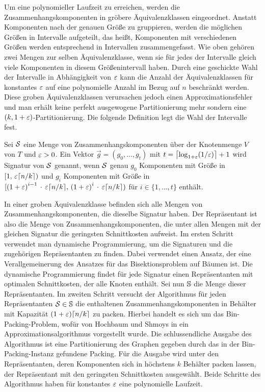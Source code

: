 Um eine polynomieller Laufzeit zu erreichen, werden die Zusammenhangskomponenten in gröbere Äquivalenzklassen eingeordnet.
Anstatt Komponenten nach der genauen Größe zu gruppieren, werden die möglichen Größen in Intervalle aufgeteilt, das heißt, Komponenten mit verschiedenen Größen werden entsprechend in Intervallen zusammengefasst. 
Wie oben gehören zwei Mengen zur selben Äquivalenzklasse, wenn sie für jedes der Intervalle gleich viele Komponenten in diesem Größenintervall haben.
Durch eine geschickte Wahl der Intervalle in Abhängigkeit von $\eps$ kann die Anzahl der Äquivalenzklassen für konstantes $\eps$ auf eine polynomielle Anzahl im Bezug auf $n$ beschränkt werden.
Diese groben Äquivalenzklassen verursachen jedoch einen Approximationsfehler und man erhält keine perfekt ausgewogene Partitionierung mehr sondern eine $(k, 1+\eps)$\hyp Partitionierung. Die folgende Definition legt die Wahl der Intervalle fest. \\

\begin{defn}[Signatur]\label{defn:signature}
    Sei $\calS$ eine Menge von Zusammenhangskomponenten über der Knotenmenge $V$ von $T$ und $\eps > 0$. Ein Vektor $\vec{g} = (g_0, \ldots, g_t)$ mit $t = \ceil*{\log_{1+\eps}(1/\eps)} + 1$ wird Signatur von $\calS$ genannt, wenn $\calS$ genau $g_0$ Komponenten mit Größe in $[1,\, \eps \ceil*{n/k})$ und $g_i$ Komponenten mit Größe in $[{(1+\eps)}^{i-1}\, \cdot\, \eps \ceil*{n/k},\, {(1+\eps)}^i\, \cdot \, \eps \ceil*{n/k})$ für $i \in \{1, \ldots, t\}$ enthält.
\end{defn}

In einer groben Äquivalenzklasse befinden sich alle Mengen von Zusammenhangskomponenten, die dieselbe Signatur haben.
Der Repräsentant ist also die Menge von Zusammenhangskomponenten, die unter allen Mengen mit der gleichen Signatur die geringsten Schnittkosten aufweist.
Im ersten Schritt verwendet man dynamische Programmierung, um die Signaturen und die zugehörigen Repräsentanten zu finden.
Dabei verwendet einen Ansatz, der eine Verallgemeinerung des Ansatzes für das Bisektionsproblem auf Bäumen ist. \parencite{mcg78, ws11}
Die dynamische Programmierung findet für jede Signatur einen Repräsentanten mit optimalen Schnittkosten, der alle Knoten enthält.
Sei nun $\bbS$ die Menge dieser Repräsentanten.
Im zweiten Schritt versucht der Algorithmus für jeden Repräsentanten $\calS \in \bbS$ die enthaltenen Zusammenhangskomponenten in Behälter mit Kapazität $(1+\eps)\ceil*{n/k}$ zu packen. 
Hierbei handelt es sich um das Bin-Packing-Problem, wofür von Hochbaum und Shmoys in \parencite{hs86} ein Approximationsalgorithmus vorgestellt wurde.
Die schlussendliche Ausgabe des Algorithmus ist eine Partitionierung des Graphen gegeben durch das in der Bin-Packing-Instanz gefundene Packing.
Für die Ausgabe wird unter den Repräsentanten, deren Komponenten sich in höchstens $k$ Behälter packen lassen, der Repräsentant mit den geringsten Schnittkosten ausgewählt.
Beide Schritte des Algorithmus haben für konstantes $\eps$ eine polynomielle Laufzeit.

